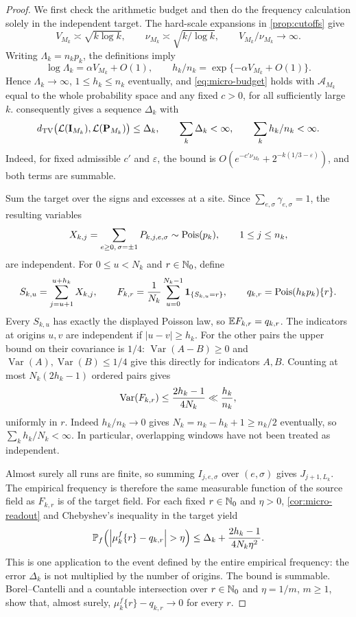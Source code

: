 \begin{proof}
We first check the arithmetic budget and then do the frequency
calculation solely in the independent target. The hard-scale
expansions in \cref{prop:cutoffs} give
\[
 V_{M_k}\asymp\sqrt{k\log k},\qquad
 \nu_{M_k}\asymp\sqrt{k/\log k},\qquad
 V_{M_k}/\nu_{M_k}\longrightarrow\infty.
\]
Writing $\Lambda_k=n_kp_k$, the definitions imply
\[
 \log\Lambda_k=\alpha V_{M_k}+O(1),\qquad
 h_k/n_k=\exp\{-\alpha V_{M_k}+O(1)\}.
\]
Hence $\Lambda_k\to\infty$, $1\le h_k\le n_k$ eventually, and
\eqref{eq:micro-budget} holds with $\mathcal A_{M_k}$ equal to the whole
probability space and any fixed $c>0$, for all sufficiently large $k$.
 consequently gives a sequence $\Delta_k$ with
\[
 d_{\mathrm{TV}}\bigl(\mathcal L(\mathbf I_{M_k}),\mathcal L(\mathbf P_{M_k})\bigr)
 \le\Delta_k,\qquad
 \sum_k\Delta_k<\infty,\qquad
 \sum_k h_k/n_k<\infty.
\]
Indeed, for fixed admissible $c'$ and $\varepsilon$, the bound is
$O(e^{-c'\nu_{M_k}}+2^{-k(1/3-\varepsilon)})$, and both terms are
summable.

Sum the target over the signs and excesses at a site. Since
$\sum_{e,\sigma}\gamma_{e,\sigma}=1$, the resulting variables
\[
 X_{k,j}=\sum_{e\ge0,\,\sigma=\pm1}P_{k,j,e,\sigma}
 \sim\operatorname{Pois}(p_k),\qquad 1\le j\le n_k,
\]
are independent. For $0\le u<N_k$ and $r\in\mathbb N_0$, define
\[
 S_{k,u}=\sum_{j=u+1}^{u+h_k}X_{k,j},\qquad
 F_{k,r}=\frac1{N_k}\sum_{u=0}^{N_k-1}\mathbf 1_{\{S_{k,u}=r\}},
 \qquad q_{k,r}=\operatorname{Pois}(h_kp_k)\{r\}.
\]
Every $S_{k,u}$ has exactly the displayed Poisson law, so
$\mathbb E F_{k,r}=q_{k,r}$. The indicators at origins $u,v$ are independent
if $|u-v|\ge h_k$. For the other pairs the upper bound on their covariance is $1/4$:
$\operatorname{Var}(A-B)\ge0$ and
$\operatorname{Var}(A),\operatorname{Var}(B)\le1/4$ give this directly
for indicators $A,B$. Counting at most $N_k(2h_k-1)$ ordered pairs gives
\[
 \operatorname{Var}(F_{k,r})\le\frac{2h_k-1}{4N_k}\ll\frac{h_k}{n_k},
\]
uniformly in $r$. Indeed $h_k/n_k\to0$ gives
$N_k=n_k-h_k+1\ge n_k/2$ eventually, so $\sum_k h_k/N_k<\infty$.
In particular, overlapping windows have not been treated as independent.

Almost surely all runs are finite, so summing
$I_{j,e,\sigma}$ over $(e,\sigma)$ gives $J_{j+1,L_k}$.
The empirical frequency is therefore the same measurable function of
the source field as $F_{k,r}$ is of the target field. For each fixed
$r\in\mathbb N_0$ and $\eta>0$, \cref{cor:micro-readout} and Chebyshev's
inequality in the target yield
\[
 \PP_f\!\left(\left|\mu_k^f\{r\}-q_{k,r}\right|>\eta\right)
 \le\Delta_k+\frac{2h_k-1}{4N_k\eta^2}.
\]
This is one application to the event defined by the entire empirical
frequency: the error $\Delta_k$ is not multiplied by the number of
origins. The bound is summable. Borel--Cantelli and a countable
intersection over $r\in\mathbb N_0$ and $\eta=1/m$, $m\ge1$, show that, almost
surely, $\mu_k^f\{r\}-q_{k,r}\to0$ for every $r$.


\end{proof}
